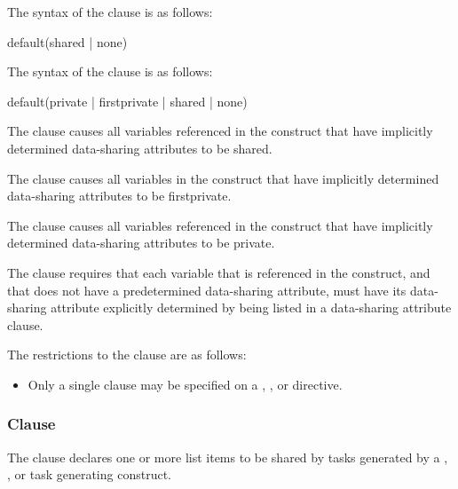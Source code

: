 \syntax
\begin{ccppspecific}
The syntax of the  clause is as follows:

\begin{ompSyntax}
default(shared \textnormal{|} none)
\end{ompSyntax}
\end{ccppspecific}

\begin{fortranspecific}
The syntax of the  clause is as follows:

\begin{ompSyntax}
default(private \textnormal{|} firstprivate \textnormal{|} shared \textnormal{|} none)
\end{ompSyntax}
\end{fortranspecific}

\descr
The  clause causes all variables referenced in the construct 
that have implicitly determined data-sharing attributes to be shared.

\begin{fortranspecific}
The  clause causes all variables in the construct that 
have implicitly determined data-sharing attributes to be firstprivate.

The  clause causes all variables referenced in the construct 
that have implicitly determined data-sharing attributes to be private.
\end{fortranspecific}

The  clause requires that each variable that is referenced 
in the construct, and that does not have a predetermined data-sharing attribute, 
must have its data-sharing attribute explicitly determined by being listed in a 
data-sharing attribute clause.

\restrictions
The restrictions to the  clause are as follows:

\begin{itemize}
\item Only a single  clause may be specified on a
      , ,  or  directive.
\end{itemize}



\subsubsection{ Clause}
\label{subsubsec:shared clause}
\summary
The  clause declares one or more list items to be shared by 
tasks generated by a , , or task generating construct.

